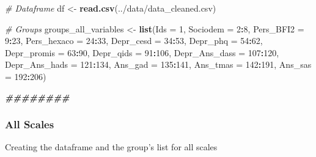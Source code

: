 \documentclass[
]{article}
\newenvironment{Shaded}{\begin{snugshade}}{\end{snugshade}}
\newcommand{\AttributeTok}[1]{\textcolor[rgb]{0.13,0.29,0.53}{#1}}
\newcommand{\CommentTok}[1]{\textcolor[rgb]{0.56,0.35,0.01}{\textit{#1}}}
\newcommand{\DecValTok}[1]{\textcolor[rgb]{0.00,0.00,0.81}{#1}}
\newcommand{\DocumentationTok}[1]{\textcolor[rgb]{0.56,0.35,0.01}{\textbf{\textit{#1}}}}
\newcommand{\FunctionTok}[1]{\textcolor[rgb]{0.13,0.29,0.53}{\textbf{#1}}}
\newcommand{\NormalTok}[1]{#1}
\newcommand{\OtherTok}[1]{\textcolor[rgb]{0.56,0.35,0.01}{#1}}
\newcommand{\SpecialCharTok}[1]{\textcolor[rgb]{0.81,0.36,0.00}{\textbf{#1}}}
\newcommand{\StringTok}[1]{\textcolor[rgb]{0.31,0.60,0.02}{#1}}
\begin{document}
\begin{Shaded}
\begin{Highlighting}[]
\CommentTok{\# Dataframe}
\NormalTok{df }\OtherTok{\textless{}{-}} \FunctionTok{read.csv}\NormalTok{(}\StringTok{\textquotesingle{}../data/data\_cleaned.csv\textquotesingle{}}\NormalTok{)}

\CommentTok{\# Groups}
\NormalTok{groups\_all\_variables }\OtherTok{\textless{}{-}} \FunctionTok{list}\NormalTok{(}\AttributeTok{Ids =} \DecValTok{1}\NormalTok{, }\AttributeTok{Sociodem =} \DecValTok{2}\SpecialCharTok{:}\DecValTok{8}\NormalTok{, }\AttributeTok{Pers\_BFI2 =} \DecValTok{9}\SpecialCharTok{:}\DecValTok{23}\NormalTok{, }\AttributeTok{Pers\_hexaco =} \DecValTok{24}\SpecialCharTok{:}\DecValTok{33}\NormalTok{, }\AttributeTok{Depr\_cesd =} \DecValTok{34}\SpecialCharTok{:}\DecValTok{53}\NormalTok{, }\AttributeTok{Depr\_phq =} \DecValTok{54}\SpecialCharTok{:}\DecValTok{62}\NormalTok{, }\AttributeTok{Depr\_promis =} \DecValTok{63}\SpecialCharTok{:}\DecValTok{90}\NormalTok{, }\AttributeTok{Depr\_qids =} \DecValTok{91}\SpecialCharTok{:}\DecValTok{106}\NormalTok{, }\AttributeTok{Depr\_Ans\_dass =} \DecValTok{107}\SpecialCharTok{:}\DecValTok{120}\NormalTok{, }\AttributeTok{Depr\_Ans\_hads =} \DecValTok{121}\SpecialCharTok{:}\DecValTok{134}\NormalTok{, }\AttributeTok{Ans\_gad =} \DecValTok{135}\SpecialCharTok{:}\DecValTok{141}\NormalTok{, }\AttributeTok{Ans\_tmas =} \DecValTok{142}\SpecialCharTok{:}\DecValTok{191}\NormalTok{, }\AttributeTok{Ans\_sas =} \DecValTok{192}\SpecialCharTok{:}\DecValTok{206}\NormalTok{)}

\DocumentationTok{\#\#\#\#\#\#\#\#}
\end{Highlighting}
\end{Shaded}

\subsubsection{All Scales}\label{all-scales}

Creating the dataframe and the group's list for all scales
\end{document}
